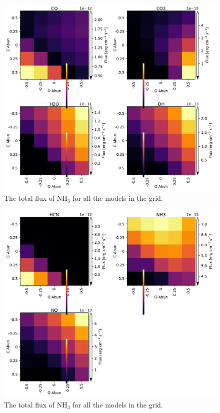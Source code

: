 \documentclass[oneside, single, authoryear, semicolon]{lion-msc}
\newcommand{\4}{$_4$}
\newcommand{\3}{$_3$}
\newcommand{\2}{$_2$}
\begin{document}
\begin{figure}[!ht]
    \centering
    \includegraphics[width=\linewidth]{Figures/Heatmaps1.pdf}
    \caption{The total flux of NH\3 for all the models in the grid.}
    \label{fig: flux NH3}
\end{figure}
\begin{figure}[!ht]
    \centering
    \includegraphics[width=\linewidth]{Figures/Heatmaps2.pdf}
    \caption{The total flux of NH\3 for all the models in the grid.}
    \label{fig: flux NH3}
\end{figure}
\end{document}
